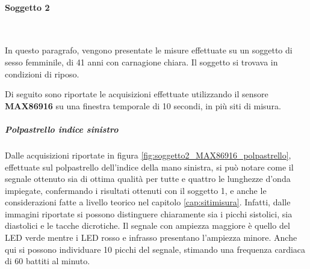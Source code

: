 \clearpage
\paragraph{Soggetto 2}~

\vspace{1cm}

\noindent In questo paragrafo, vengono presentate le misure effettuate su un soggetto di sesso femminile, di 41 anni con carnagione chiara. Il soggetto si trovava in condizioni di riposo.

\vspace{0.5cm}

\noindent Di seguito sono riportate le acquisizioni effettuate utilizzando il sensore \textbf{MAX86916} su una finestra temporale di 10 secondi, in più siti di misura.

\subparagraph{Polpastrello indice sinistro}
Dalle acquisizioni riportate in figura \ref{fig:soggetto2_MAX86916_polpastrello}, effettuate sul polpastrello dell'indice della mano sinistra, si può notare come il segnale ottenuto sia di ottima qualità per tutte e quattro le lunghezze d'onda impiegate, confermando i risultati ottenuti con il soggetto 1, e anche le considerazioni fatte a livello teorico nel capitolo \ref{cap:sitimisura}. Infatti, dalle immagini riportate si possono distinguere chiaramente sia i picchi sistolici, sia diastolici e le tacche dicrotiche. Il segnale con ampiezza maggiore è quello del LED verde mentre i LED rosso e infrasso presentano l'ampiezza minore. Anche qui si possono individuare 10 picchi del segnale, stimando una frequenza cardiaca di 60 battiti al minuto.
